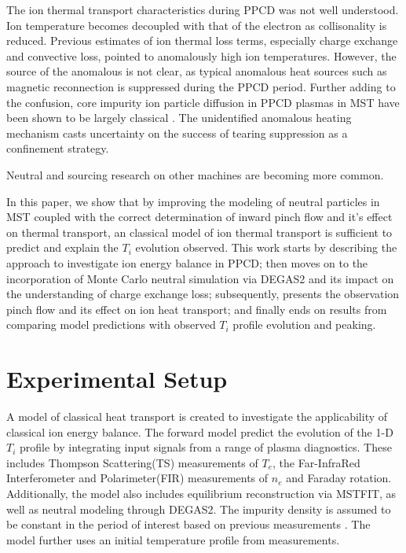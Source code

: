 \documentclass[aip, pop, preprint]{revtex4-1}
\begin{document}
The ion thermal transport characteristics during PPCD was not well understood.
Ion temperature becomes decoupled with that of the electron as collisonality is
reduced. Previous estimates of ion thermal loss terms, especially charge
exchange and convective loss, pointed to anomalously high ion
temperatures\cite{Fiksel2006Confinement, Wyman2007THEPLASMAS, BiewerThesis}.
However, the source of the anomalous is not clear, as typical anomalous heat
sources such as magnetic reconnection is suppressed during the PPCD period.
Further adding to the confusion, core impurity ion particle diffusion in PPCD
plasmas in MST have been shown to be largely classical \cite{Kumar12prl}. The
unidentified anomalous heating mechanism casts uncertainty on the success of
tearing suppression as a confinement strategy.

Neutral and sourcing research on other machines are becoming more common. 

In this paper, we show that by improving the modeling of neutral particles in
MST coupled with the correct determination of inward pinch flow and it's effect
on thermal transport, an classical model of ion thermal transport is sufficient
to predict and explain the $T_i$ evolution observed. This work starts by
describing the approach to investigate ion energy balance in PPCD; then moves
on to the incorporation of Monte Carlo neutral simulation via DEGAS2 and its
impact on the understanding of charge exchange loss; subsequently, presents the
observation pinch flow and its effect on ion heat transport; and finally ends
on results from comparing model predictions with observed $T_{i}$ profile
evolution and peaking.

\section{Experimental Setup}

A model of classical heat transport is created to investigate the applicability
of classical ion energy balance. The forward model predict the evolution of the
1-D $T_i$ profile by integrating input signals from a range of plasma
diagnostics. These includes Thompson Scattering(TS) measurements of $T_e$, the
Far-InfraRed Interferometer and Polarimeter(FIR) measurements of $n_e$ and
Faraday rotation. Additionally, the model also includes equilibrium
reconstruction via MSTFIT\cite{Anderson04}, as well as neutral modeling through
DEGAS2. The impurity density is assumed to be constant in the period of
interest based on previous measurements \cite{Kumar12pop,Nornberg18FST}. The
model further uses an initial temperature profile from measurements. 
\end{document}
